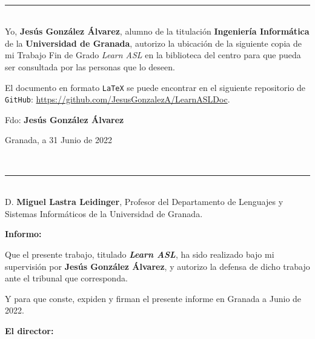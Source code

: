 \newpage
\thispagestyle{empty}
\
\vspace{3cm}

\noindent\rule[-1ex]{\textwidth}{2pt}\\[4.5ex]

Yo, \textbf{Jesús González Álvarez}, alumno de la titulación \textbf{Ingeniería Informática} de la \textbf{Universidad de Granada}, autorizo la ubicación de la siguiente copia de mi Trabajo Fin de Grado \textit{Learn ASL} en la biblioteca del centro para que pueda ser consultada por las personas que lo deseen.

\bigskip
El documento en formato {\tt LaTeX} se puede encontrar en el siguiente repositorio de {\tt GitHub}: \url{https://github.com/JesusGonzalezA/LearnASLDoc}.

\vspace{7.5cm}

\noindent Fdo: \textbf{Jesús González Álvarez}

\vspace{2cm}

\begin{flushright}
Granada, a 31 Junio de 2022
\end{flushright}

\newpage
\thispagestyle{empty}
\
\vspace{3cm}

\noindent\rule[-1ex]{\textwidth}{2pt}\\[4.5ex]

D. \textbf{Miguel Lastra Leidinger}, Profesor del Departamento de Lenguajes y Sistemas Informáticos de la Universidad de Granada.


\vspace{0.5cm}

\textbf{Informo:}

\vspace{0.5cm}

Que el presente trabajo, titulado \textit{\textbf{Learn ASL}},
ha sido realizado bajo mi supervisión por \textbf{Jesús González Álvarez}, y autorizo la defensa de dicho trabajo ante el tribunal
que corresponda.

\vspace{0.5cm}

Y para que conste, expiden y firman el presente informe en Granada a Junio de 2022.

\vspace{1cm}

\textbf{El director: }

\vspace{4cm}

